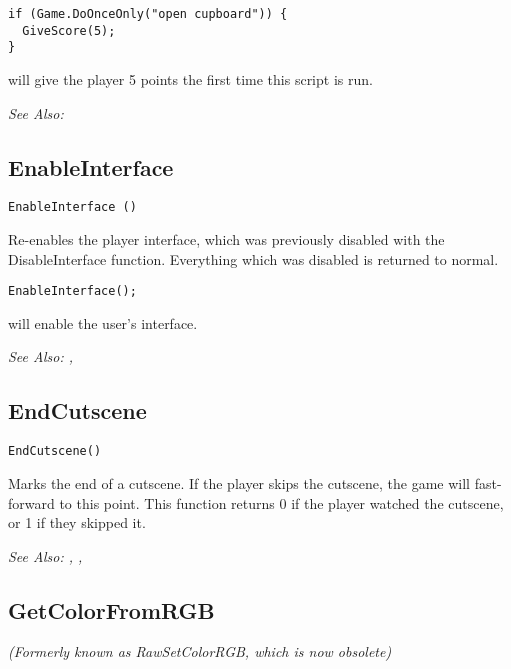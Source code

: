 \begin{verbatim}
if (Game.DoOnceOnly("open cupboard")) {
  GiveScore(5);
}
\end{verbatim}
will give the player 5 points the first time this script is run.

\it{See Also:} 


\subsection{EnableInterface}\label{EnableInterface}%

\begin{verbatim}
EnableInterface ()
\end{verbatim}
Re-enables the player interface, which was previously disabled with
the DisableInterface function. Everything which was disabled is returned
to normal.

\begin{verbatim}
EnableInterface();
\end{verbatim}
will enable the user's interface.

\it{See Also:} , 


\subsection{EndCutscene}\label{EndCutscene}%

\begin{verbatim}
EndCutscene()
\end{verbatim}

Marks the end of a cutscene. If the player skips the cutscene, the game will
fast-forward to this point. This function returns 0 if the player watched the cutscene,
or 1 if they skipped it.

\it{See Also:} ,
,


\subsection{GetColorFromRGB}\label{Game.GetColorFromRGB}%

\it{(Formerly known as RawSetColorRGB, which is now obsolete)}

